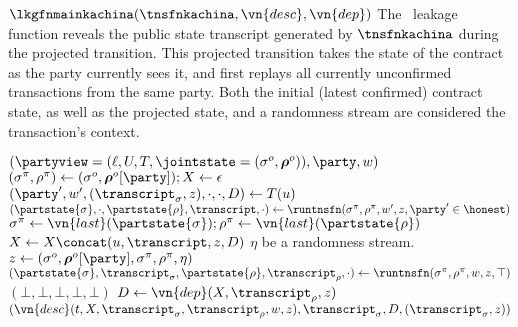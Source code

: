 \begin{leakagefn}{$\lkgfnmainkachina(\tnsfnkachina, \vn{desc}, \vn{dep})$}
  The \kachina\ leakage function reveals the public state transcript generated by
  $\tnsfnkachina$ during the projected transition. This projected transition takes
  the state of the contract as the party currently sees it, and first replays
  all currently unconfirmed transactions from the same party. Both the initial
  (latest confirmed) contract state, as well as the projected state, and a
  randomness stream are considered the transaction's context.

  \vsep

  \begin{receiveinput*}{$(\partyview = (\ell, U, T, \jointstate = (\sigma^o, \boldsymbol\rho^o)), \party, w)$}
    \State \Let $(\sigma^\pi, \rho^\pi) \gets (\sigma^o, \boldsymbol\rho^o[\party]); X \gets \epsilon$
      \State \Let $(\party', w', (\transcript_\sigma, z), \cdot, \cdot, D) \gets T(u)$
      \State \Let $(\partstate{\sigma}, \cdot, \partstate{\rho}, \transcript, \cdot) \gets
        \runtnsfn(\sigma^\pi, \rho^\pi, w', z, \party' \in \honest)$
      \State \Let $\sigma^\pi \gets \vn{last}(\partstate{\sigma}); \rho^\pi
        \gets \vn{last}(\partstate{\rho})$
      \State \Let $X \gets X \concat (u, \transcript, z, D)$
    \EndFor
    \State \Let $\eta$ be a randomness stream.
    \State \Let $z \gets (\sigma^o, \boldsymbol\rho^o[\party], \sigma^\pi,
      \rho^\pi, \eta)$
    \State \Let $(\partstate{\sigma}, \transcript_\sigma, \partstate{\rho}, \transcript_\rho, \cdot)
      \gets \runtnsfn(\sigma^\pi, \rho^\pi, w, z, \top)$
      \State \Return $(\bot, \bot, \bot, \bot, \bot)$
    \Else
      \State \Let $D \gets \vn{dep}(X, \transcript_\rho, z)$
      \State \Return $(\vn{desc}(t, X, \transcript_\sigma, \transcript_\rho,
        w, z), \transcript_\sigma, D, (\transcript_\sigma, z))$
    \EndIf
  \end{receiveinput*}
\end{leakagefn}
